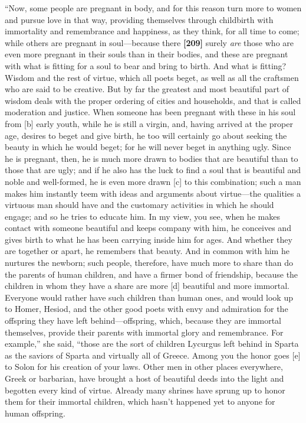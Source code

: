 “Now, some people are pregnant in body, and for this reason turn more to
women and pursue love in that way, providing themselves through
childbirth with immortality and remembrance and happiness, as they
think, for all time to come; while others are pregnant in soul---because
there {\bf {[}209{]}} surely {\em are} those who are even more pregnant
in their souls than in their bodies, and these are pregnant with what is
fitting for a soul to bear and bring to birth. And what is fitting?
Wisdom and the rest of virtue, which all poets beget, as well as all the
craftsmen who are said to be creative. But by far the greatest and most
beautiful part of wisdom deals with the proper ordering of cities and
households, and that is called moderation and justice. When someone has
been pregnant with these in his soul from {[}b{]} early youth, while he
is still a virgin, and, having arrived at the proper age, desires to
beget and give birth, he too will certainly go about seeking the beauty
in which he would beget; for he will never beget in anything ugly. Since
he is pregnant, then, he is much more drawn to bodies that are beautiful
than to those that are ugly; and if he also has the luck to find a soul
that is beautiful and noble and well-formed, he is even more drawn
{[}c{]} to this combination; such a man makes him instantly teem with
ideas and arguments about virtue---the qualities a virtuous man should
have and the customary activities in which he should engage; and so he
tries to educate him. In my view, you see, when he makes contact with
someone beautiful and keeps company with him, he conceives and gives
birth to what he has been carrying inside him for ages. And whether they
are together or apart, he remembers that beauty. And in common with him
he nurtures the newborn; such people, therefore, have much more to share
than do the parents of human children, and have a firmer bond of
friendship, because the children in whom they have a share are more
{[}d{]} beautiful and more immortal. Everyone would rather have such
children than human ones, and would look up to Homer, Hesiod, and the
other good poets with envy and admiration for the offspring they have
left behind---offspring, which, because they are immortal themselves,
provide their parents with immortal glory and remembrance. For example,”
she said, “those are the sort of children
Lycurgus left behind
in Sparta as the saviors of Sparta and virtually all of Greece. Among
you the honor goes {[}e{]} to Solon for his creation of your laws. Other
men in other places everywhere, Greek or barbarian, have brought a host
of beautiful deeds into the light and begotten every kind of virtue.
Already many shrines have sprung up to honor them for their immortal
children, which hasn't happened yet to anyone for human offspring.

